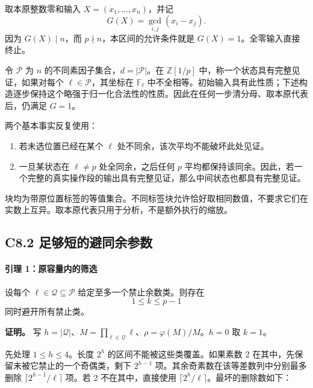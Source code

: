 {取本原整数零和输入} \(X=(x_1,\ldots,x_n)\){，并记} \[
G(X)=\gcd_{i,j}(x_i-x_j).
\] {因为} \(G(X)\mid n\){，而} \(p\nmid n\){，本区间的允许条件就是} \(G(X)=1\){。全零输入直接终止。}

{令} \(\mathcal P\) {为} \(n\) {的不同素因子集合，}\(d=|\mathcal P|\){。在} \(\mathbb Z[1/p]\) {中，称一个状态具有完整见证，如果对每个} \(\ell\in\mathcal P\){，其坐标在} \(\mathbb F_\ell\) {中不全相等。初始输入具有此性质；下述构造逐步保持这个略强于归一化合法性的性质。因此在任何一步清分母、取本原代表后，仍满足} \(G=1\){。}

{两个基本事实反复使用：}

\begin{enumerate}
\def\labelenumi{\arabic{enumi}.}
\tightlist
\item
  {若未选位置已经在某个} \(\ell\) {处不同余，该次平均不能破坏此处见证。}
\item
  {一旦某状态在} \(\ell\ne p\) {处全同余，之后任何} \(p\) {平均都保持该同余。因此，若一个完整的真实操作段的输出具有完整见证，那么中间状态也都具有完整见证。}
\end{enumerate}

{块均为带原位置标签的等值集合。不同标签块允许恰好取相同数值，不要求它们在实数上互异。取本原代表只用于分析，不是额外执行的缩放。}

\subsection*{\texorpdfstring{{C8.2} {足够短的避同余参数}}{C8.2 足够短的避同余参数}}\label{C8-h46}

\paragraph*{\texorpdfstring{{引理} {1：原容量内的筛选}}{引理 1：原容量内的筛选}}\label{C8-h47}

{设每个} \(\ell\in\mathcal Q\subseteq\mathcal P\) {给定至多一个禁止余数类。则存在} \[
1\le k\le p-1
\tag{C8.2}
\] {同时避开所有禁止类。}

\textbf{{证明。}} {写} \(h=|\mathcal Q|\){、}\(M=\prod_{\ell\in\mathcal Q}\ell\){、}\(\rho=\varphi(M)/M\){。}\(h=0\) {取} \(k=1\){。}

{先处理} \(1\le h\le4\){。长度} \(2^h\) {的区间不能被这些类覆盖。如果素数} {2} {在其中，先保留未被它禁止的一个奇偶类，剩下} \(2^{h-1}\) {项。其余奇素数在该等差数列中分别最多删除} \(\lceil 2^{h-1}/\ell\rceil\) {项。若} {2} {不在其中，直接使用} \(\lceil2^h/\ell\rceil\){。最坏的删除数如下：}

